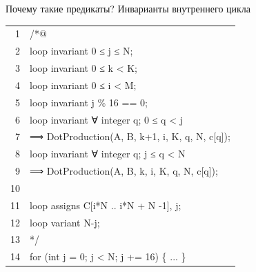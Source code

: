 \documentclass[aspectratio=169, 11pt]{beamer}
\newcommand{\AK}[1]{\textcolor{acslkw}{#1}}   %
\newcommand{\AT}[1]{\textcolor{acslty}{#1}}   %
\newcommand{\AQ}[1]{\textcolor{acslqu}{#1}}   %
\newcommand{\AI}[1]{\textcolor{acslid}{#1}}   %
\newcommand{\AN}[1]{\textcolor{acslnm}{#1}}   %
\newcommand{\AL}[1]{\textcolor{acsllg}{#1}}   %
\newcommand{\AC}[1]{\textcolor{acslcm}{#1}}   %
\begin{document}
\begin{frame}[fragile]{Почему такие предикаты? Инварианты внутреннего цикла}
	\ttfamily\small
	\setlength{\baselineskip}{1.15em}
	\setlength{\parindent}{0pt}
	
	\begingroup
	\setlength{\fboxsep}{0pt}%
	\colorbox{codebg}{%
		\begin{minipage}{\linewidth}
			\vspace{6pt}%
			\hspace{8pt}%
			\begin{tabular}{@{}r@{\hspace{1.2em}}l@{}}
				\textcolor{ln}{1} & \AC{/*@} \\
				\textcolor{ln}{2} & \hspace{2em}\AK{loop invariant} \AN{0} \AL{≤} \AI{j} \AL{≤} \AI{N}; \\
				\textcolor{ln}{3} & \hspace{2em}\AK{loop invariant} \AN{0} \AL{≤} \AI{k} \AL{<} \AI{K}; \\
				\textcolor{ln}{4} & \hspace{2em}\AK{loop invariant} \AN{0} \AL{≤} \AI{i} \AL{<} \AI{M}; \\
				\textcolor{ln}{5} & \hspace{2em}\AK{loop invariant} \AI{j} \AL{\%} \AN{16} \AL{==} \AN{0}; \\
				\textcolor{ln}{6} & \hspace{2em}\AK{loop invariant} \AQ{∀} \AT{integer} \AI{q}; \AN{0} \AL{≤} \AI{q} \AL{<} \AI{j} \\
				\textcolor{ln}{7} & \hspace{4em}\AL{⟹} \AI{DotProduction}(\AI{A}, \AI{B}, \AI{k}\AN{+1}, \AI{i}, \AI{K}, \AI{q}, \AI{N}, \AI{c}[\AI{q}]); \\
				\textcolor{ln}{8} & \hspace{2em}\AK{loop invariant} \AQ{∀} \AT{integer} \AI{q}; \AI{j} \AL{≤} \AI{q} \AL{<} \AI{N} \\
				\textcolor{ln}{9} & \hspace{4em}\AL{⟹} \AI{DotProduction}(\AI{A}, \AI{B}, \AI{k}, \AI{i}, \AI{K}, \AI{q}, \AI{N}, \AI{c}[\AI{q}]); \\
				\textcolor{ln}{10} & \\
				\textcolor{ln}{11} & \hspace{2em}\AK{loop assigns} \AI{C}[\AI{i}\AI{*}\AI{N} \AL{..} \AI{i}\AI{*}\AI{N} \AL{+} \AI{N} \AN{-1}], \AI{j}; \\
				\textcolor{ln}{12} & \hspace{2em}\AK{loop variant} \AI{N}\AN{-}\AI{j}; \\
				\textcolor{ln}{13} & \AC{*/} \\
				\textcolor{ln}{14} & \AK{for} (\AT{int} \AI{j} \AL{=} \AN{0}; \AI{j} \AL{<} \AI{N}; \AI{j} \AL{+=} \AN{16}) \{ \AC{...} \} \\
			\end{tabular}
			\hspace{8pt}%
			\vspace{4pt}%
		\end{minipage}%
	}%
	\endgroup
\end{frame}
\end{document}
